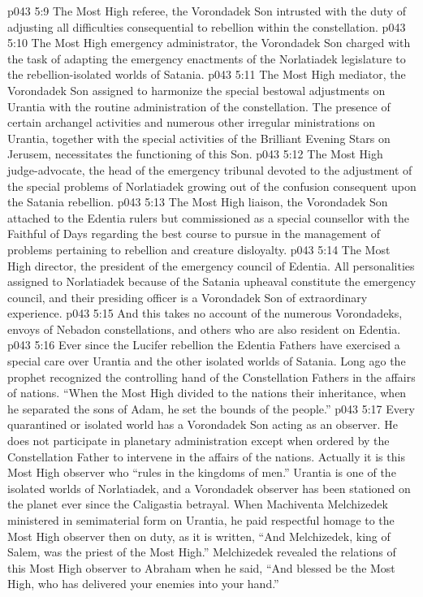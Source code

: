 \vs p043 5:9 \bibnobreakspace The Most High referee, the Vorondadek Son intrusted with the duty of adjusting all difficulties consequential to rebellion within the constellation.
\vs p043 5:10 \bibnobreakspace The Most High emergency administrator, the Vorondadek Son charged with the task of adapting the emergency enactments of the Norlatiadek legislature to the rebellion\hyp{}isolated worlds of Satania.
\vs p043 5:11 \bibnobreakspace The Most High mediator, the Vorondadek Son assigned to harmonize the special bestowal adjustments on Urantia with the routine administration of the constellation. The presence of certain archangel activities and numerous other irregular ministrations on Urantia, together with the special activities of the Brilliant Evening Stars on Jerusem, necessitates the functioning of this Son.
\vs p043 5:12 \bibnobreakspace The Most High judge\hyp{}advocate, the head of the emergency tribunal devoted to the adjustment of the special problems of Norlatiadek growing out of the confusion consequent upon the Satania rebellion.
\vs p043 5:13 \bibnobreakspace The Most High liaison, the Vorondadek Son attached to the Edentia rulers but commissioned as a special counsellor with the Faithful of Days regarding the best course to pursue in the management of problems pertaining to rebellion and creature disloyalty.
\vs p043 5:14 \bibnobreakspace The Most High director, the president of the emergency council of Edentia. All personalities assigned to Norlatiadek because of the Satania upheaval constitute the emergency council, and their presiding officer is a Vorondadek Son of extraordinary experience.
\vs p043 5:15 And this takes no account of the numerous Vorondadeks, envoys of Nebadon constellations, and others who are also resident on Edentia.
\vs p043 5:16 \pc Ever since the Lucifer rebellion the Edentia Fathers have exercised a special care over Urantia and the other isolated worlds of Satania. Long ago the prophet recognized the controlling hand of the Constellation Fathers in the affairs of nations. “When the Most High divided to the nations their inheritance, when he separated the sons of Adam, he set the bounds of the people.”
\vs p043 5:17 Every quarantined or isolated world has a Vorondadek Son acting as an observer. He does not participate in planetary administration except when ordered by the Constellation Father to intervene in the affairs of the nations. Actually it is this Most High observer who “rules in the kingdoms of men.” Urantia is one of the isolated worlds of Norlatiadek, and a Vorondadek observer has been stationed on the planet ever since the Caligastia betrayal. When Machiventa Melchizedek ministered in semimaterial form on Urantia, he paid respectful homage to the Most High observer then on duty, as it is written, “And Melchizedek, king of Salem, was the priest of the Most High.” Melchizedek revealed the relations of this Most High observer to Abraham when he said, “And blessed be the Most High, who has delivered your enemies into your hand.”
